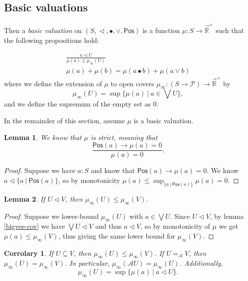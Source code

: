 \documentclass{article}           %
\newtheorem{lemma}{Lemma}
\newtheorem{corrolary}{Corrolary}
\newcommand{\R}{\mathbb{R}}
\newcommand{\lowerT}[1]{\overrightarrow{#1}}
\newcommand{\cov}{\vartriangleleft}
\newcommand{\Pos}{\mathsf{Pos}}
\newcommand{\Prop}{\mathcal{P}}
\newcommand{\suchthat}{\ |\ }
\begin{document}
\subsection{Basic valuations}

Then a \emph{basic valuation} on $(S, \cov, \bullet, \vee, \Pos)$ is a function $\mu : S \to \lowerT{\R}^+$ such that the following propositions hold:

\begin{gather*}
\frac
{a \cov U}
{\mu(a) \le \mu_\infty(U) }
\tag{monotone}
\\
\mu(a) + \mu(b) = \mu(a \bullet b) + \mu(a \vee b)
\tag{modular}
\end{gather*}
where we define the extension of $\mu$ to open covers $\mu_\infty : (S \to \Prop) \to \lowerT{\R}^+$ by
\[
\mu_\infty(U) = \sup \{ \mu(a) \suchthat a \in \bigvee U \},
\]
and we define the supremum of the empty set as 0.

In the remainder of this section, assume $\mu$ is a basic valuation.

\begin{lemma}
We know that $\mu$ is \emph{strict}, meaning that
\[
\frac
{\Pos(a) \to \mu(a) = 0}
{\mu(a) = 0}.
\tag{strict}
\]
\end{lemma}
\begin{proof}
Suppose we have $a : S$ and know that $\Pos(a) \to \mu(a) = 0$. We know $a \cov \{ a \suchthat \Pos(a) \}$, so by monotonicity $\mu(a) \le \sup_{\{a \suchthat \Pos(a)\}} \mu(a) = 0$.
\end{proof}

\begin{lemma}
If $U \cov V$, then $\mu_\infty(U) \le \mu_\infty(V)$.
\end{lemma}
\begin{proof}
Suppose we lower-bound $\mu_\infty(U)$ with $a \in \bigvee U$. Since $U \cov V$, by lemma \ref{bigvee-cov} we have $\bigvee U \cov V$ and thus $a \cov V$, so by monotonicity of $\mu$ we get $\mu(a) \le \mu_\infty(V)$, thus giving the same lower bound for $\mu_\infty(V)$.
\end{proof}

\begin{corrolary}
If $U \subseteq V$, then $\mu_\infty(U) \le \mu_\infty(V)$. If $U =_\mathcal{A} V$, then $\mu_\infty(U) = \mu_\infty(V)$. In particular, $\mu_\infty(\mathcal{A}U) = \mu_\infty(U)$. Additionally,
\[
\mu_\infty(U) = \sup \{\mu(a) \suchthat a \cov U \}.
\]
\end{corrolary}
\end{document}
